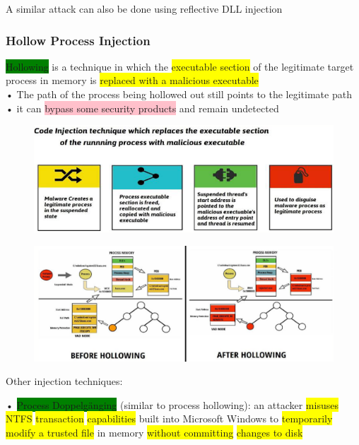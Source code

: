 \documentclass[]{project_plan}
\begin{document}
A similar attack can also be done using reflective DLL injection

\subsubsection{Hollow Process Injection}

\colorbox{green}{Hollowing} is a technique in which the \colorbox{yellow}{executable section} of the legitimate target process in
memory is \colorbox{yellow}{replaced with a malicious executable}\\
• The path of the process being hollowed out still points to the legitimate path\\
• it can \colorbox{pink}{bypass some security products} and remain undetected

\begin{figure}[H]
  \centering
  \includegraphics[width=\linewidth]{hollowing.png}
\end{figure}

\begin{figure}[H]
  \centering
  \includegraphics[width=\linewidth]{hollowing 2.png}
\end{figure}

Other injection techniques:

• \colorbox{green}{Process Doppelgänging} (similar to process hollowing): an attacker \colorbox{yellow}{misuses NTFS} \colorbox{yellow}{transaction}
\colorbox{yellow}{capabilities} built into Microsoft Windows to \colorbox{yellow}{temporarily modify a trusted file} in memory
\colorbox{yellow}{without committing} \colorbox{yellow}{changes to disk}
\end{document}
